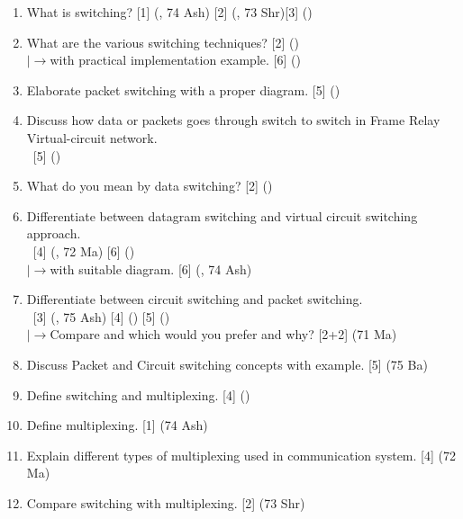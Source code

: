 \documentclass[12pt]{article}
\newcommand{\lb}{\\$\left|\rightarrow\right.$}
\newcommand{\enter}{\\\textcolor{white}{1}}
\begin{document}
		\begin{enumerate}[noitemsep, topsep=0pt]
			\item What is switching? \hfill [1] (, 74 Ash) [2] (, 73 Shr)[3] ()
			
			\item What are the various switching techniques? \hfill [2] ()
			\lb with practical implementation example. \hfill [6] ()

			\item Elaborate packet switching with a proper diagram. \hfill [5] ()	
			
			\item Discuss how data or packets goes through switch to switch in Frame Relay Virtual-circuit network.
			\enter\hfill [5] ()
			
			\item What do you mean by data switching? \hfill [2] ()
			
			\item Differentiate between datagram switching and virtual circuit switching approach. 
			\enter \hfill [4] (, 72 Ma) [6] ()
			\lb with suitable diagram. \hfill [6] (, 74 Ash)
			
			\item Differentiate between circuit switching and packet switching. 
			\enter\hfill [3] (, 75 Ash) [4] () [5] ()
			\lb Compare and which would you prefer and why? \hfill [2+2] (71 Ma)
			
			\item Discuss Packet and Circuit switching concepts with example. \hfill [5] (75 Ba)
			
			\item Define switching and multiplexing. \hfill [4] ()			
			
			\item Define multiplexing. \hfill [1] (74 Ash)
			
			\item Explain different types of multiplexing used in communication system. \hfill [4] (72 Ma)
			
			\item Compare switching with multiplexing. \hfill [2] (73 Shr)
		\end{enumerate}
\end{document}
